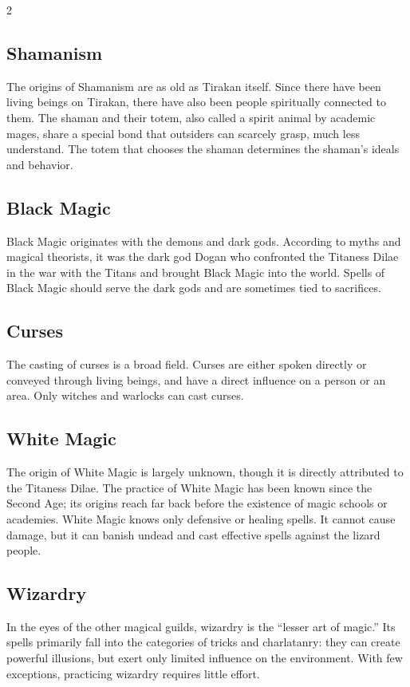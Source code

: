 \begin{multicols}{2}
{\subsection{Shamanism}\label{subsec:schamanismus}

The origins of Shamanism are as old as Tirakan itself. Since there have been living beings on Tirakan, there have also been people spiritually connected to them. The shaman and their totem, also called a spirit animal by academic mages, share a special bond that outsiders can scarcely grasp, much less understand. The totem that chooses the shaman determines the shaman's ideals and behavior.

\subsection{Black Magic}\label{subsec:schwarze-magie}

Black Magic originates with the demons and dark gods. According to myths and magical theorists, it was the dark god Dogan who confronted the Titaness Dilae in the war with the Titans and brought Black Magic into the world. Spells of Black Magic should serve the dark gods and are sometimes tied to sacrifices.

\subsection{Curses}\label{subsec:verfluchungen}

The casting of curses is a broad field. Curses are either spoken directly or conveyed through living beings, and have a direct influence on a person or an area. Only witches and warlocks can cast curses.

\subsection{White Magic}\label{subsec:weie-magie}

The origin of White Magic is largely unknown, though it is directly attributed to the Titaness Dilae. The practice of White Magic has been known since the Second Age; its origins reach far back before the existence of magic schools or academies. White Magic knows only defensive or healing spells. It cannot cause damage, but it can banish undead and cast effective spells against the lizard people.

\subsection{Wizardry}\label{subsec:zauberei}

In the eyes of the other magical guilds, wizardry is the ``lesser art of magic.'' Its spells primarily fall into the categories of tricks and charlatanry: they can create powerful illusions, but exert only limited influence on the environment. With few exceptions, practicing wizardry requires little effort.
}{}
\end{multicols}
